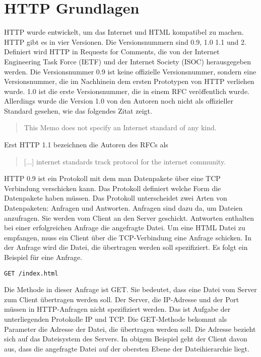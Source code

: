 \documentclass{llncs}
\begin{document}
\section{HTTP Grundlagen}
HTTP wurde entwickelt, um das Internet und HTML kompatibel zu machen. HTTP gibt es in vier Versionen. Die Versionsnummern sind 0.9, 1.0 1.1 und 2. Definiert wird HTTP in Requests for Comments, die von der Internet Engineering Task Force (IETF) und der Internet Society (ISOC) herausgegeben werden. Die Versionsnummer 0.9 ist keine offizielle Versionsnummer, sondern eine Versionsnummer, die im Nachhinein dem ersten Prototypen von HTTP verliehen wurde. 1.0 ist die erste Versionsnummer, die in einem RFC veröffentlich wurde. Allerdings wurde die Version 1.0 von den Autoren noch nicht als offizieller Standard gesehen, wie das folgendes Zitat zeigt. \begin{quote} This Memo does not specify an Internet standard of any kind. \cite{Berners-Lee1996} \end{quote} Erst HTTP 1.1 bezeichnen die Autoren des RFCs als \begin{quote}[...] internet standards track protocol for the internet community. \cite{Fielding1999} \end{quote} HTTP 0.9 ist ein Protokoll mit dem man Datenpakete über eine TCP Verbindung verschicken kann. Das Protokoll definiert welche Form die Datenpakete haben müssen. Das Protokoll unterscheidet zwei Arten von Datenpaketen: Anfragen und Antworten. Anfragen sind dazu da, um Dateien anzufragen. Sie werden vom Client an den Server geschickt. Antworten enthalten bei einer erfolgreichen Anfrage die angefragte Datei. Um eine HTML Datei zu empfangen, muss ein Client über die TCP-Verbindung eine Anfrage schicken. In der Anfrage wird die Datei, die übertragen werden soll spezifiziert. Es folgt ein Beispiel für eine Anfrage.
\begin{verbatim}
GET /index.html
\end{verbatim}
Die Methode in dieser Anfrage ist GET. Sie bedeutet, dass eine Datei vom Server zum Client übertragen werden soll. Der Server, die IP-Adresse und der Port müssen in HTTP-Anfragen nicht spezifiziert werden. Das ist Aufgabe der unterliegenden Protokolle IP und TCP. Die GET-Methode bekommt als Parameter die Adresse der Datei, die übertragen werden soll. Die Adresse bezieht sich auf das Dateisystem des Servers. In obigem Beispiel geht der Client davon aus, dass die angefragte Datei auf der obersten Ebene der Dateihierarchie liegt.\newline
\end{document}
